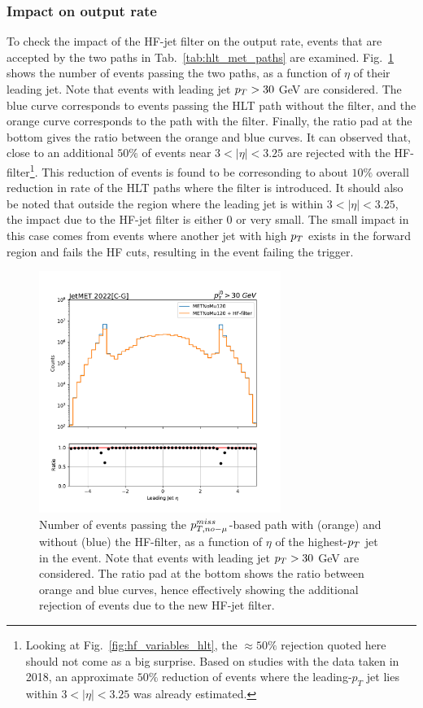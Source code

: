 \subsubsection{Impact on output rate}

To check the impact of the HF-jet filter on the output rate, events that are accepted by the two paths in Tab.~\ref{tab:hlt_met_paths} are examined. Fig.~\ref{fig:filterhf_rate}
shows the number of events passing the two paths, as a function of $\eta$ of their leading jet. Note that events with leading jet $p_T > 30$ GeV are considered. 
The blue curve corresponds to events passing the HLT path without the filter, and the orange curve corresponds to the path with the filter. Finally, the ratio pad at the bottom
gives the ratio between the orange and blue curves. It can observed that, close to an additional $50\%$ of events near $3<|\eta|<3.25$ are rejected 
with the HF-filter\footnote{Looking at Fig.~\ref{fig:hf_variables_hlt}, the $\approx 50\%$ rejection quoted here should not come as a big surprise.
Based on studies with the data taken in 2018, an approximate $50\%$ reduction of events where the leading-$p_{T}$ jet lies within $3 < |\eta| < 3.25$
was already estimated.}. 
This reduction of events is found to be corresonding to about $10\%$ overall reduction in rate of the HLT paths where the filter is introduced. It should also be noted that
outside the region where the leading jet is within $3 < |\eta| < 3.25$, the impact due to the HF-jet filter is either $0$ or very small. The small impact in this case comes from
events where another jet with high $p_T$ exists in the forward region and fails the HF cuts, resulting in the event failing the trigger.

\begin{figure}[htbp]
    \centering
    \includegraphics[width=0.7\textwidth]{HFFilter/merged_2023-02-10_hlt_full_JetMET_2022_run/ak4_eta0_filterhf.pdf}    
    \caption{Number of events passing the $p_{T,no-\mu}^{miss}$-based path with (orange) and without (blue) the HF-filter, as a function of $\eta$ of the highest-$p_T$ jet in the event.
    Note that events with leading jet $p_T > 30$ GeV are considered. The ratio pad at the bottom shows the ratio between orange and blue curves, hence effectively showing the additional
    rejection of events due to the new HF-jet filter.}
    \label{fig:filterhf_rate}
\end{figure}

\clearpage